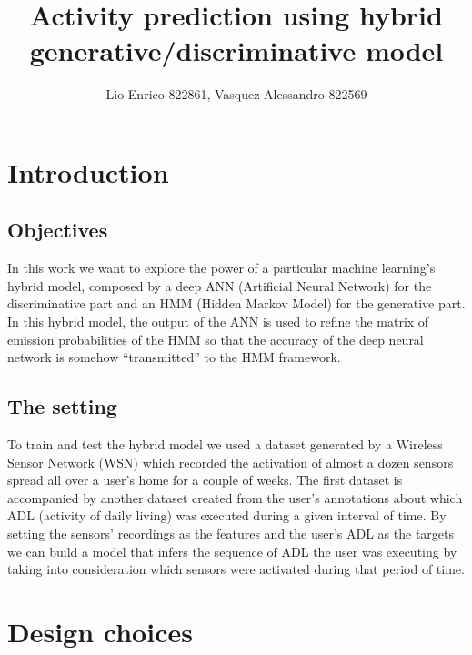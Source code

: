 \documentclass[10pt,a4paper]{article}
\title{Activity prediction using hybrid generative/discriminative model}
\author{Lio Enrico 822861, Vasquez Alessandro 822569}
\begin{document}
	\maketitle
	\newpage
	\section{Introduction}
	\subsection{Objectives}
	In this work we want to explore the power of a particular machine learning's hybrid model, composed by a deep ANN (Artificial Neural Network) for the discriminative part and an HMM (Hidden Markov Model) for the generative part. In this hybrid model, the output of the ANN is used to refine the matrix of emission probabilities of the HMM so that the accuracy of the deep neural network is somehow ``transmitted'' to the HMM framework.
	\subsection{The setting}
	To train and test the hybrid model we used a dataset generated by a Wireless Sensor Network (WSN) which recorded the activation of almost a dozen sensors spread all over a user's home for a couple of weeks. The first dataset is accompanied by another dataset created from the user's annotations about which ADL (activity of daily living) was executed during a given interval of time. By setting the sensors' recordings as the features and the user's ADL as the targets we can build a model that infers the sequence of ADL the user was executing by taking into consideration which sensors were activated during that period of time. 
	
	\section{Design choices}
\end{document}
